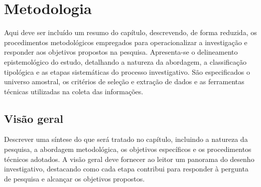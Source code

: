 %
\chapter{Metodologia}
\label{ch:metodologia}
\begin{resumocapitulo}
  Aqui deve ser incluído um resumo do capítulo, descrevendo, de forma reduzida, os procedimentos metodológicos empregados para operacionalizar a investigação e responder aos objetivos propostos na pesquisa. Apresenta-se o delineamento epistemológico do estudo, detalhando a natureza da abordagem, a classificação tipológica e as etapas sistemáticas do processo investigativo. São especificados o universo amostral, os critérios de seleção e extração de dados e as ferramentas técnicas utilizadas na coleta das informações.
\end{resumocapitulo}


\section{Visão geral}
\label{sec:visao_geral_metodologia}
Descrever uma síntese do que será tratado no capítulo, incluindo a natureza da pesquisa, a abordagem metodológica, os objetivos específicos e os procedimentos técnicos adotados. A visão geral deve fornecer ao leitor um panorama do desenho investigativo, destacando como cada etapa contribui para responder à pergunta de pesquisa e alcançar os objetivos propostos.

